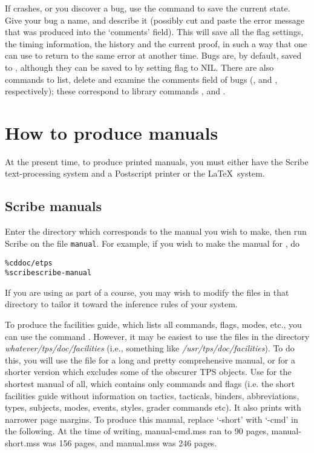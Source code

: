 If {\TPS} crashes, or you discover a bug, use the  command
to save the current state. Give your bug a name, and describe it (possibly
cut and paste the error message that was produced into the `comments' field).
This will save all the flag settings, the timing information, the history and
the current proof, in such a way that one can use 
to return to the same error at another time. Bugs are, by default, saved to
, although they can be saved to 
by setting flag  to NIL. There are also commands to list,
delete and examine the comments field of bugs (, 
and , respectively); these correspond to library commands ,
 and .

\section{How to produce manuals}
At the present time, to produce printed manuals, you must either have the
Scribe text-processing system and a Postscript printer or the \LaTeX ~system.


\subsection{Scribe manuals}
Enter the directory which corresponds to the manual you wish to make,
 then run Scribe on the file
{\tt manual}.  For example, if you wish to make the manual for {\ETPS}, do

\begin{alltt}
\% cd doc/etps
\% scribe scribe-manual
\end{alltt}

If you are using {\ETPS} as part of a course, you may wish to modify
the files in that directory to tailor it toward the inference rules
of your system.

To produce the facilities guide, which lists all commands, flags, modes,
etc., you can use the {\TPS} command .
However, it may be easiest to use the
files in the directory {\it whatever/tps/doc/facilities}
(i.e., something like {\it /usr/tps/doc/facilities}). To do this,
you will use the file  for a long and pretty comprehensive
manual, or  for a shorter version which excludes some of the
obscurer TPS objects.
Use  for the shortest manual of all, which contains only commands
and flags (i.e. the short facilities guide
without information on tactics, tacticals, binders, abbreviations, types,
subjects, modes, events, styles, grader commands etc). It also prints with
narrower page margins. To produce this manual, replace `-short'
with `-cmd' in the following. At the time of writing, manual-cmd.mss ran to 90 pages,
manual-short.mss was 156 pages, and manual.mss was 246 pages.

